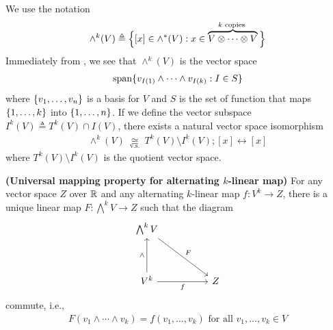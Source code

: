 \documentclass{report}
\begin{document}
\begin{mdframed}
We use the notation 
\begin{align*}
\wedge^k(V) \triangleq \Big\{  [x] \in \wedge ^*(V): x \in \overbrace{V \otimes  \cdots \otimes  V}^{k\text{ copies }} \Big\} 
\end{align*}
Immediately from , we see that $\wedge ^k (V) $ is the vector space 
\begin{align*}
\operatorname{span}\{ v_{I(1)}\wedge  \cdots \wedge  v_{I(k)}:I \in S   \}
\end{align*}
where $\{ v_1,\dots ,v_n \}$ is a basis for $V$ and $S$ is the set of function that maps  $\{ 1,\dots ,k \}$ into $\{ 1,\dots ,n \}$. If we define the vector subspace $I^k(V)\triangleq T^k(V)\cap I(V)$, there exists a natural vector space isomorphism
\begin{align*}
\wedge  ^k(V)\underset{\text{ v.s. }}{\cong }T^k(V)\setminus I^k(V);[x]\leftrightarrow [x]
\end{align*}
where $T^k(V)\setminus I^k(V)$ is the quotient vector space.
\end{mdframed}
\begin{theorem}
\label{Universal mapping property for alternating $k$-linear map}
\textbf{(Universal mapping property for alternating $k$-linear map)} For any vector space $Z$ over  $\mathbb{R}$ and any alternating  $k$-linear map  $f:V^k\rightarrow Z$, there is a unique linear map $F:\bigwedge ^k V\rightarrow Z $ such that the diagram 
\[\begin{tikzcd}
	{\bigwedge^k V } \\
	\\
	{V^k} && Z
	\arrow["F", from=1-1, to=3-3]
	\arrow["{\wedge }", from=3-1, to=1-1]
	\arrow["f"', from=3-1, to=3-3]
\end{tikzcd}\]
commute, i.e., 
\begin{align*}
F(v_1\wedge \cdots \wedge  v_k  )=f(v_1,\dots ,v_k) \text{ for all }v_1,\dots,v_k \in V
\end{align*}
\end{theorem}
\end{document}
